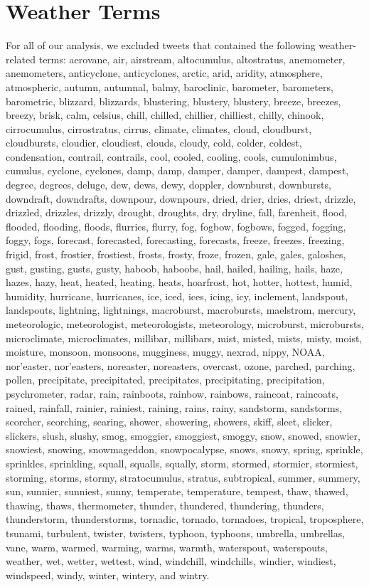 \documentclass[9pt,twoside,lineno]{pnas-new}
\begin{document}
\section*{Weather Terms}
For all of our analysis, we excluded tweets that contained the following weather-related terms: aerovane, air, airstream, altocumulus, altostratus, anemometer, anemometers, anticyclone, anticyclones, arctic, arid, aridity, atmosphere, atmospheric, autumn, autumnal, balmy, baroclinic, barometer, barometers, barometric, blizzard, blizzards, blustering, blustery, blustery, breeze, breezes, breezy, brisk, calm, celsius, chill, chilled, chillier, chilliest, chilly, chinook, cirrocumulus, cirrostratus, cirrus, climate, climates, cloud, cloudburst, cloudbursts, cloudier, cloudiest, clouds, cloudy, cold, colder, coldest, condensation, contrail, contrails, cool, cooled, cooling, cools, cumulonimbus, cumulus, cyclone, cyclones, damp, damp, damper, damper, dampest, dampest, degree, degrees, deluge, dew, dews, dewy, doppler, downburst, downbursts, downdraft, downdrafts, downpour, downpours, dried, drier, dries, driest, drizzle, drizzled, drizzles, drizzly, drought, droughts, dry, dryline, fall, farenheit, flood, flooded, flooding, floods, flurries, flurry, fog, fogbow, fogbows, fogged, fogging, foggy, fogs, forecast, forecasted, forecasting, forecasts, freeze, freezes, freezing, frigid, frost, frostier, frostiest, frosts, frosty, froze, frozen, gale, gales, galoshes, gust, gusting, gusts, gusty, haboob, haboobs, hail, hailed, hailing, hails, haze, hazes, hazy, heat, heated, heating, heats, hoarfrost, hot, hotter, hottest, humid, humidity, hurricane, hurricanes, ice, iced, ices, icing, icy, inclement, landspout, landspouts, lightning, lightnings, macroburst, macrobursts, maelstrom, mercury, meteorologic, meteorologist, meteorologists, meteorology, microburst, microbursts, microclimate, microclimates, millibar, millibars, mist, misted, mists, misty, moist, moisture, monsoon, monsoons, mugginess, muggy, nexrad, nippy, NOAA, nor'easter, nor'easters, noreaster, noreasters, overcast, ozone, parched, parching, pollen, precipitate, precipitated, precipitates, precipitating, precipitation, psychrometer, radar, rain, rainboots, rainbow, rainbows, raincoat, raincoats, rained, rainfall, rainier, rainiest, raining, rains, rainy, sandstorm, sandstorms, scorcher, scorching, searing, shower, showering, showers, skiff, sleet, slicker, slickers, slush, slushy, smog, smoggier, smoggiest, smoggy, snow, snowed, snowier, snowiest, snowing, snowmageddon, snowpocalypse, snows, snowy, spring, sprinkle, sprinkles, sprinkling, squall, squalls, squally, storm, stormed, stormier, stormiest, storming, storms, stormy, stratocumulus, stratus, subtropical, summer, summery, sun, sunnier, sunniest, sunny, temperate, temperature, tempest, thaw, thawed, thawing, thaws, thermometer, thunder, thundered, thundering, thunders, thunderstorm, thunderstorms, tornadic, tornado, tornadoes, tropical, troposphere, tsunami, turbulent, twister, twisters, typhoon, typhoons, umbrella, umbrellas, vane, warm, warmed, warming, warms, warmth, waterspout, waterspouts, weather, wet, wetter, wettest, wind, windchill, windchills, windier, windiest, windspeed, windy, winter, wintery, and wintry.



\end{document}
